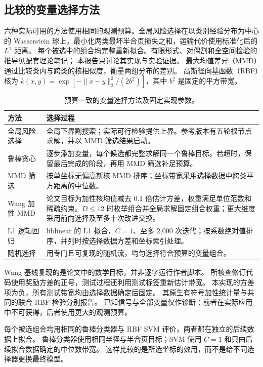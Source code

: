 \documentclass[11pt,a4paper]{article}
\begin{document}
\subsection{比较的变量选择方法}
六种实际可用的方法使用相同的观测预算。全局风险选择在以类别经验分布为中心的
Wasserstein 球上，最小化两类最坏半合页损失之和，运输代价使用标准化后的 $L^1$ 距离。
每个被选中的组合均完整重新拟合。有限形式、对偶割和全空间检验的推导见配套理论笔记；
本报告只讨论其实现与实验证据。
最大均值差异（MMD）通过比较类内与跨类的核相似度，衡量两组分布的差别。
高斯径向基函数（RBF）核为
$k(x,y)=\exp[-\|x-y\|_2^2/(2b^2)]$，其中 $b^2$ 是固定的平方带宽。
\begin{table}[tbp]\centering\small
\caption{预算一致的变量选择方法及固定实现参数。}\label{tab:selectors}
\begin{tabularx}{\linewidth}{@{}p{26mm}Y@{}}\toprule
方法 & 选择过程\\\midrule
全局风险选择 & 全局下界割搜索；实际可行检验提供上界。参考版本有五轮根节点求解，并以 MMD 筛选结果启动。\\
鲁棒贪心 & 逐步添加变量，每个候选都完整求解同一个鲁棒目标。若超时，保留最后完成的阶段，再用 MMD 筛选补足预算。\\
MMD 筛选 & 按单坐标无偏高斯核 MMD 排序；坐标带宽采用选择数据中跨类平方距离的中位数。\\
Wang 加性 MMD & 论文目标为加性核均值减去 $0.1$ 倍估计方差，权重满足单位范数和稀疏约束。$D\le12$ 时枚举组合并全局求解固定组合权重；更大维度采用前向选择及至多十次改进交换。\\
L1 逻辑回归 & liblinear 的 L1 拟合，$C=1$、至多 2,000 次迭代；按系数绝对值排序，并列时按选择数据方差和坐标索引处理。\\
随机选择 & 用专门且可复现的随机流，均匀选择符合预算的变量组合。\\\bottomrule
\end{tabularx}\end{table}

Wang 基线复现的是论文中的数学目标，并非逐字运行作者脚本。
所核查修订代码使用奖励方差的正号，测试过程还利用测试标签重新估计带宽。
本实现的方差项为负，所有测试带宽均由选择数据确定后固定。
其原生有符号加性统计量与共同的联合 RBF 检验分别报告。
已知信号与全部变量仅作诊断：前者在实际应用中不可获得，后者使用更大的观测预算。

每个被选组合均用相同的鲁棒分类器与 RBF SVM 评价，两者都在独立的后续数据上拟合。
鲁棒分类器使用相同半径与半合页目标；SVM 使用 $C=1$ 和只由后续拟合数据确定的中位数带宽。
这样比较的是所选坐标的效用，而不是给不同选择器更换最终模型。
\end{document}
